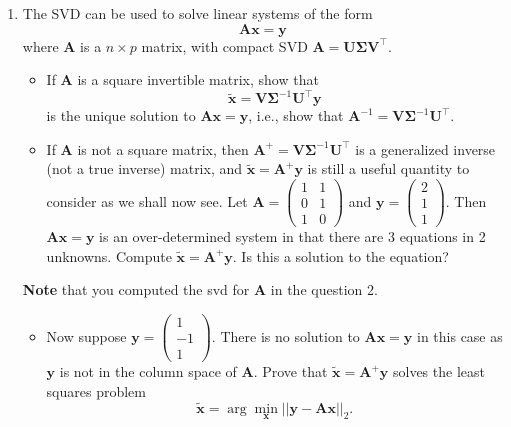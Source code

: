 \documentclass[]{book}
\providecommand{\tightlist}{%
  \setlength{\itemsep}{0pt}\setlength{\parskip}{0pt}}
\theoremstyle{definition}
\theoremstyle{definition}
\theoremstyle{definition}
\theoremstyle{remark}
\begin{document}
\begin{enumerate}
\def\labelenumi{\arabic{enumi}.}
\setcounter{enumi}{2}
\item
  The SVD can be used to solve linear systems of the form
  \[\boldsymbol A\boldsymbol x= \boldsymbol y\]
  where \(\boldsymbol A\) is a \(n\times p\) matrix, with compact SVD
  \(\boldsymbol A= \boldsymbol U\boldsymbol \Sigma\boldsymbol V^\top\).

  \begin{itemize}
  \item
    If \(\boldsymbol A\) is a square invertible matrix, show that \[\tilde{\boldsymbol x} = \boldsymbol V\boldsymbol \Sigma^{-1} \boldsymbol U^\top \boldsymbol y\] is the unique solution to \(\boldsymbol A\boldsymbol x= \boldsymbol y\), i.e., show that \(\boldsymbol A^{-1} = \boldsymbol V\boldsymbol \Sigma^{-1} \boldsymbol U^\top\).
  \item
    If \(\boldsymbol A\) is not a square matrix, then \(\boldsymbol A^+ = \boldsymbol V\boldsymbol \Sigma^{-1} \boldsymbol U^\top\) is a generalized inverse (not a true inverse) matrix, and
    \(\tilde{\boldsymbol x}=\boldsymbol A^+\boldsymbol y\) is still a useful quantity to consider as we shall now see. Let \(\boldsymbol A=\left(\begin{array}{cc}1&1\\0&1\\1&0\end{array} \right)\) and \(\boldsymbol y= \left(\begin{array}{c}2\\1\\1\end{array} \right)\). Then \(\boldsymbol A\boldsymbol x=\boldsymbol y\) is an over-determined system in that there are 3 equations in 2 unknowns. Compute \(\tilde{\boldsymbol x}=\boldsymbol A^+\boldsymbol y\). Is this a solution to the equation?
  \end{itemize}

  \textbf{Note} that you computed the svd for \(\boldsymbol A\) in the question 2.

  \begin{itemize}
  \tightlist
  \item
    Now suppose \(\boldsymbol y= \left(\begin{array}{c}1\\-1\\1\end{array} \right)\). There is no solution to \(\boldsymbol A\boldsymbol x=\boldsymbol y\) in this case as \(\boldsymbol y\) is not in the column space of \(\boldsymbol A\). Prove that \({\tilde{\boldsymbol x}} = \boldsymbol A^+\boldsymbol y\) solves the least squares problem
    \[\tilde{\boldsymbol x} = \arg\min_{\boldsymbol x}||\boldsymbol y- \boldsymbol A\boldsymbol x||_2.\]
  \end{itemize}


\end{enumerate}
\end{document}
